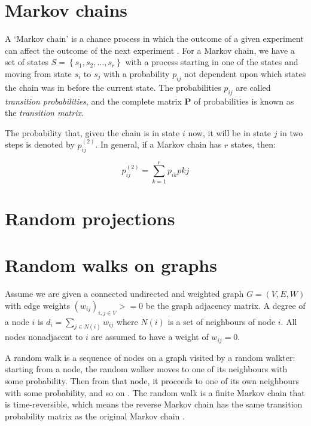 \section{Markov chains}
\label{sec:markovChains}
A `Markov chain' is a chance process in which the outcome of a given experiment 
can affect the outcome of the next experiment \cite{Grinstead:1997}. For a 
Markov chain, we have a set of states $S = \left\{ s_{1}, s_{2}, \ldots, s_{r} 
\right\}$ with a process starting in one of the states and moving from state 
$s_{i}$ to $s_{j}$ with a probability $p_{ij}$ not dependent upon which states 
the chain was in before the current state. The probabilities $p_{ij}$ are called
\emph{transition probabilities}, and the complete matrix $\mathbf{P}$ of 
probabilities is known as the \emph{transition matrix}.

The probability that, given the chain is in state $i$ now, it will be in state 
$j$ in two steps is denoted by $p_{ij}^{(2)}$. In general, if a Markov chain has 
$r$ states, then:

\begin{displaymath}
p_{ij}^{(2)} = \sum_{k=1}^{r} p_{ik}p{kj}
\end{displaymath}

\section{Random projections}
\label{sec:randomProjections}

\section{Random walks on graphs}
\label{sec:randomWalks}

Assume we are given a connected undirected and weighted graph $G = (V,E,W)$ with
edge weights $(w_{ij})_{i,j \in V} >= 0$ be the graph adjacency matrix. A degree
of a node $i$ is $d_{i} = \sum_{j \in N(i)} w_{ij}$ where $N(i)$ is a set of 
neighbours of node $i$. All nodes nonadjacent to $i$ are assumed to have a 
weight of $w_{ij} = 0$.

A random walk is a sequence of nodes on a graph visited by a random walkter: 
starting from a node, the random walker moves to one of its neighbours with some
probability. Then from that node, it proceeds to one of its own neighbours with 
some probability, and so on \cite{Khoa:2012}. The random walk is a finite Markov
chain that is time-reversible, which means the reverse Markov chain has the same
transition probability matrix as the original Markov chain \cite{Lovasz:1996}.

